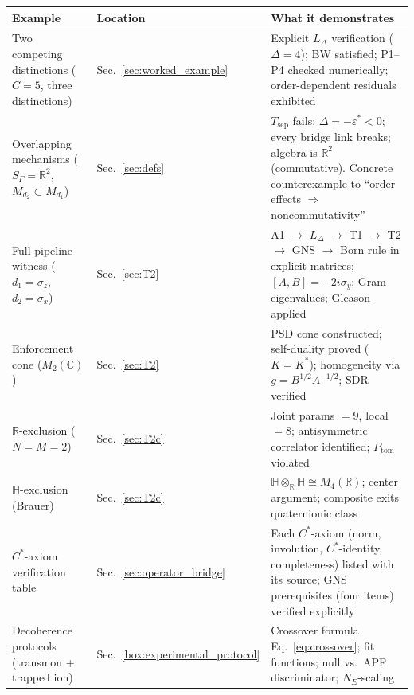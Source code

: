 \documentclass[11pt]{article}
\theoremstyle{remark}
\begin{document}
\begin{center}
\smallskip
\renewcommand{\arraystretch}{1.25}
\begin{tabular}{@{}p{3.8cm}p{2.5cm}p{6.1cm}@{}}
\textbf{Example} & \textbf{Location} & \textbf{What it demonstrates} \\[2pt]
\hline\noalign{\smallskip}
Two competing distinctions ($C = 5$, three distinctions) & Sec.~\ref{sec:worked_example} & Explicit $L_\Delta$ verification ($\Delta = 4$); BW satisfied; P1--P4 checked numerically; order-dependent residuals exhibited \\[3pt]
Overlapping mechanisms ($S_\Gamma = \mathbb{R}^2$, $M_{d_2} \subset M_{d_1}$) & Sec.~\ref{sec:defs} & $T_{\mathrm{sep}}$ fails; $\Delta = -\varepsilon^* < 0$; every bridge link breaks; algebra is $\mathbb{R}^2$ (commutative). Concrete counterexample to ``order effects $\Rightarrow$ noncommutativity'' \\[3pt]
Full pipeline witness ($d_1 = \sigma_z$, $d_2 = \sigma_x$) & Sec.~\ref{sec:T2} & A1 $\to$ $L_\Delta$ $\to$ T1 $\to$ T2 $\to$ GNS $\to$ Born rule in explicit matrices; $[A,B] = -2i\sigma_y$; Gram eigenvalues; Gleason applied \\[3pt]
Enforcement cone ($M_2(\mathbb{C})$) & Sec.~\ref{sec:T2} & PSD cone constructed; self-duality proved ($K = K^*$); homogeneity via $g = B^{1/2}A^{-1/2}$; SDR verified \\[3pt]
$\mathbb{R}$-exclusion ($N{=}M{=}2$) & Sec.~\ref{sec:T2c} & Joint params $= 9$, local $= 8$; antisymmetric correlator identified; $P_{\mathrm{tom}}$ violated \\[3pt]
$\mathbb{H}$-exclusion (Brauer) & Sec.~\ref{sec:T2c} & $\mathbb{H} \otimes_\mathbb{R} \mathbb{H} \cong M_4(\mathbb{R})$; center argument; composite exits quaternionic class \\[3pt]
$C^*$-axiom verification table & Sec.~\ref{sec:operator_bridge} & Each $C^*$-axiom (norm, involution, $C^*$-identity, completeness) listed with its source; GNS prerequisites (four items) verified explicitly \\[3pt]
Decoherence protocols (transmon + trapped ion) & Sec.~\ref{box:experimental_protocol} & Crossover formula Eq.~\eqref{eq:crossover}; fit functions; null vs.\ APF discriminator; $N_E$-scaling \\
\end{tabular}
\label{tab:worked_examples}
\end{center}
\end{document}
